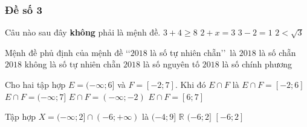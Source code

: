 \subsubsection{Đề số 3}

\begin{ex}%
	Câu nào sau đây \textbf{không} phải là mệnh đề.
	\choice
	{$3+4 \ge 8$}
	{\True $ 2+x=3$}
	{$3-2=1$}
	{$2<\sqrt 3$}
	\loigiai{
	}
\end{ex}

\begin{ex}%
	Mệnh đề phủ định của mệnh đề \lq \lq $2018$ là số tự nhiên chẵn\rq \rq \, là
	\choice
	{$ 2018 $ là số chẵn}
	{\True $ 2018 $ không là số tự nhiên chẵn}
	{$ 2018 $ là số nguyên tố}
	{$ 2018 $ là số chính phương}
\end{ex}

\begin{ex}%
	Cho hai tập hợp $E=(-\infty;6]$ và $F=[-2;7]$. Khi đó $E\cap F$ là
	\choice
	{\True $E\cap F = [-2;6]$}
	{$E\cap F = (-\infty;7]$}
	{$E\cap F = (-\infty;-2)$}
	{$E\cap F = [6;7]$}
	\loigiai{
		\immini{
			Ta có $E \cap F=[-2;6]$.}
		{\vspace{-0.5cm}
			\begin{tikzpicture}[scale=0.7,>=stealth]
			\draw[->](-4,0)->(9,0);%
			\def\skipInterval{0.5cm}%
			\def\colorInterval{blue} %
			\IntervalLR{6}{9}\IntervalGLF{\big]}{$6$}{}{}
			\IntervalLR{-4}{-2}
			\IntervalGRF{}{}{\big[}{-2}
			\IntervalLR{7}{9}
			\IntervalGRF{\big]}{$7$}{}{}
			\end{tikzpicture}}
	}
\end{ex}

\begin{ex}%
	Tập hợp $X=(-\infty;2] \cap (-6;+\infty)$ là
	\choice
	{$(-4;9]$}
	{$\mathbb{R}$}
	{$(-6;2]$}
	{\True $[-6;2]$}
	\loigiai{
		Ta có: $X=(-6;2]$.}
\end{ex}

\begin{ex}%
	{
		\begin{venndiagram2sets}[tikzoptions={scale=0.7,thick}]
			\fillANotB
	\end{venndiagram2sets}}	
\loigiai{
}
\end{ex}

